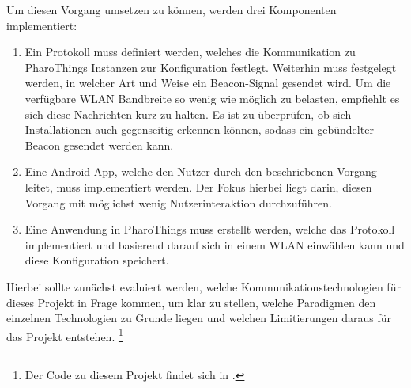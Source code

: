     Um diesen Vorgang umsetzen zu können, werden drei Komponenten implementiert:
    \begin{enumerate}
        \item Ein Protokoll muss definiert werden, welches die Kommunikation zu PharoThings Instanzen zur Konfiguration festlegt.
        Weiterhin muss festgelegt werden, in welcher Art und Weise ein Beacon-Signal gesendet wird.
        Um die verfügbare WLAN Bandbreite so wenig wie möglich zu belasten, empfiehlt es sich diese Nachrichten kurz zu halten. Es ist zu überprüfen,
        ob sich Installationen auch gegenseitig erkennen können, sodass ein gebündelter Beacon gesendet werden kann.
        \item Eine Android App, welche den Nutzer durch den beschriebenen Vorgang leitet, muss implementiert werden.
        Der Fokus hierbei liegt darin, diesen Vorgang mit möglichst wenig Nutzerinteraktion durchzuführen.
        \item Eine Anwendung in PharoThings muss erstellt werden, welche das Protokoll implementiert
        und basierend darauf sich in einem WLAN einwählen kann und diese Konfiguration speichert.
    \end{enumerate}

    Hierbei sollte zunächst evaluiert werden, welche Kommunikationstechnologien für dieses Projekt in Frage kommen, um klar zu stellen, welche Paradigmen den einzelnen Technologien zu Grunde liegen und welchen Limitierungen daraus für das Projekt entstehen. \footnote{Der Code zu diesem Projekt findet sich in \cite{main-repository}.}